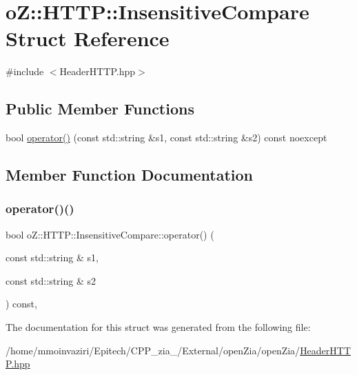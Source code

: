 \hypertarget{structo_z_1_1_h_t_t_p_1_1_insensitive_compare}{}\section{oZ\+::H\+T\+TP\+::Insensitive\+Compare Struct Reference}
\label{structo_z_1_1_h_t_t_p_1_1_insensitive_compare}


{\ttfamily \#include $<$Header\+H\+T\+T\+P.\+hpp$>$}

\subsection*{Public Member Functions}
\begin{DoxyCompactItemize}
\item 
bool \mbox{\hyperlink{structo_z_1_1_h_t_t_p_1_1_insensitive_compare_a7b84c1c1ce4c81aa2b452fd3d1fd8843}{operator()}} (const std\+::string \&s1, const std\+::string \&s2) const noexcept
\end{DoxyCompactItemize}


\subsection{Member Function Documentation}
\mbox{\label{structo_z_1_1_h_t_t_p_1_1_insensitive_compare_a7b84c1c1ce4c81aa2b452fd3d1fd8843}} 
\subsubsection{\texorpdfstring{operator()()}{operator()()}}
{\footnotesize\ttfamily bool o\+Z\+::\+H\+T\+T\+P\+::\+Insensitive\+Compare\+::operator() (\begin{DoxyParamCaption}\item[{const std\+::string \&}]{s1,  }\item[{const std\+::string \&}]{s2 }\end{DoxyParamCaption}) const\hspace{0.3cm}{\ttfamily [inline]}, {\ttfamily [noexcept]}}



The documentation for this struct was generated from the following file\+:\begin{DoxyCompactItemize}
\item 
/home/mmoinvaziri/\+Epitech/\+C\+P\+P\+\_\+zia\+\_/\+External/open\+Zia/open\+Zia/\mbox{\hyperlink{_header_h_t_t_p_8hpp}{Header\+H\+T\+T\+P.\+hpp}}\end{DoxyCompactItemize}
